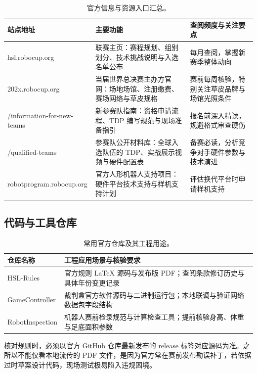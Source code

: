 \begin{table}[H]
\centering
\small
\begin{tabularx}{\textwidth}{p{4.6cm} X p{2.6cm}}
\toprule
\textbf{站点地址} & \textbf{主要功能} & \textbf{查阅频度与关注要点} \\
\midrule
hsl.robocup.org & 联赛主页：赛程规划、组别划分、技术挑战说明与入选名单公布 & 每月查阅，掌握新赛季整体动向 \\
\addlinespace
202x.robocup.org & 当届世界总决赛主办方官网：场地场馆、注册缴费、赛场网络与草皮规格 & 赛前每周核验，特别关注草皮品牌与场馆光照条件 \\
\addlinespace
/information-for-new-teams & 新参赛队指南：资格申请流程、TDP 编写规范与现场准备指引 & 报名前深入精读，规避格式审查硬伤 \\
\addlinespace
/qualified-teams & 参赛队公开材料库：全球入选队伍的 TDP、实战展示视频与硬件配置表 & 备赛必读，分析竞争对手硬件参数与技术演进 \\
\addlinespace
robotprogram.robocup.org & 官方人形机器人支持项目：硬件平台技术支持与样机支持计划 & 评估换代平台时申请样机支持 \\
\bottomrule
\end{tabularx}
\caption{官方信息与资源入口汇总。}
\end{table}

\subsection{代码与工具仓库}

\begin{table}[H]
\centering
\small
\begin{tabularx}{\textwidth}{p{3.8cm} X}
\toprule
\textbf{仓库名称} & \textbf{工程应用场景与核验要求} \\
\midrule
HSL-Rules & 官方规则 LaTeX 源码与发布版 PDF；查阅条款修订历史与具体年份变更记录 \\
\addlinespace
GameController & 裁判盒官方软件源码与二进制运行包；本地联调与验证网络数据包字段结构 \\
\addlinespace
RobotInspection & 机器人赛前检录规范与计算检查工具；提前核验身高、体重与足底面积参数 \\
\bottomrule
\end{tabularx}
\caption{常用官方仓库及其工程用途。}
\end{table}

核对规则时，必须以官方 GitHub 仓库最新发布的 release 标签对应源码为准。之所以不能仅看本地流传的 PDF 文件，是因为官方常在赛前发布勘误补丁，若依据过时草案设计代码，现场测试极易陷入违规困境。

